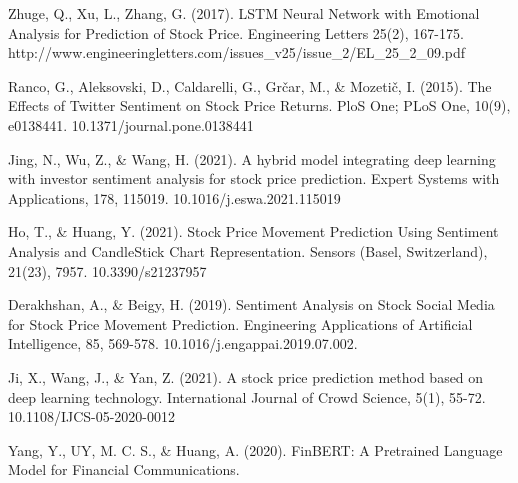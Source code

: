 \documentclass{llncs}
\begin{document}
\begin{thebibliography}{8}
\label{ref_article9} 
Zhuge, Q., Xu, L., Zhang, G. (2017). LSTM Neural Network with Emotional Analysis for Prediction of Stock Price. Engineering Letters 25(2), 167-175. http://www.engineeringletters.com/issues\_v25/issue\_2/EL\_25\_2\_09.pdf

\label{ref_article10} 
Ranco, G., Aleksovski, D., Caldarelli, G., Grčar, M., \& Mozetič, I. (2015). The Effects of Twitter Sentiment on Stock Price Returns. PloS One; PLoS One, 10(9), e0138441. 10.1371/journal.pone.0138441

\label{ref_article11} 
Jing, N., Wu, Z., \& Wang, H. (2021). A hybrid model integrating deep learning with investor sentiment analysis for stock price prediction. Expert Systems with Applications, 178, 115019. 10.1016/j.eswa.2021.115019

\label{ref_article12}
Ho, T., \& Huang, Y. (2021). Stock Price Movement Prediction Using Sentiment Analysis and CandleStick Chart Representation. Sensors (Basel, Switzerland), 21(23), 7957. 10.3390/s21237957

\label{ref_article13}
Derakhshan, A., \& Beigy, H. (2019). Sentiment Analysis on Stock Social Media for Stock Price Movement Prediction. Engineering Applications of Artificial Intelligence, 85, 569-578. 10.1016/j.engappai.2019.07.002.

\label{ref_article14}
Ji, X., Wang, J., \& Yan, Z. (2021). A stock price prediction method based on deep learning technology. International Journal of Crowd Science, 5(1), 55-72. 10.1108/IJCS-05-2020-0012

\label{ref_article15}
Yang, Y., UY, M. C. S., \& Huang, A. (2020). FinBERT: A Pretrained Language Model for Financial Communications.

\end{thebibliography}
\end{document}
